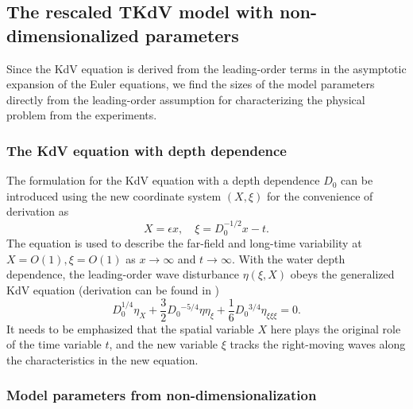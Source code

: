 \documentclass[9pt,twoside,lineno]{pnas-new}
\theoremstyle{plain}
\theoremstyle{plain}
\begin{document}
\subsection{The rescaled TKdV model with non-dimensionalized parameters}

Since the KdV equation is derived from the leading-order terms in
the asymptotic expansion of the Euler equations, we find the sizes
of the model parameters directly from the leading-order assumption
for characterizing the physical problem from the experiments. 

\subsubsection*{The KdV equation with depth dependence}

The formulation for the KdV equation with a depth dependence $D_{0}$
can be introduced using the new coordinate system $\left(X,\xi\right)$
for the convenience of derivation as
\begin{equation}
X=\epsilon x,\quad\xi=D_{0}^{-1/2}x-t.\label{eq:variables}
\end{equation}
The equation is used to describe the far-field and long-time variability
at $X=O\left(1\right),\xi=O\left(1\right)$ as $x\rightarrow\infty$
and $t\rightarrow\infty$. With the water depth dependence, the leading-order
wave disturbance $\eta\left(\xi,X\right)$ obeys the generalized KdV
equation (derivation can be found in \cite{johnson1997modern})
\begin{equation}
D_{0}^{1/4}\eta_{X}+\frac{3}{2}D_{0}{}^{-5/4}\eta\eta_{\xi}+\frac{1}{6}D_{0}{}^{3/4}\eta_{\xi\xi\xi}=0.\label{eq:KdV_depth}
\end{equation}
It needs to be emphasized that the spatial variable $X$ here plays
the original role of the time variable $t$, and the new variable
$\xi$ tracks the right-moving waves along the characteristics in
the new equation. 

\subsubsection*{Model parameters from non-dimensionalization}
\end{document}
